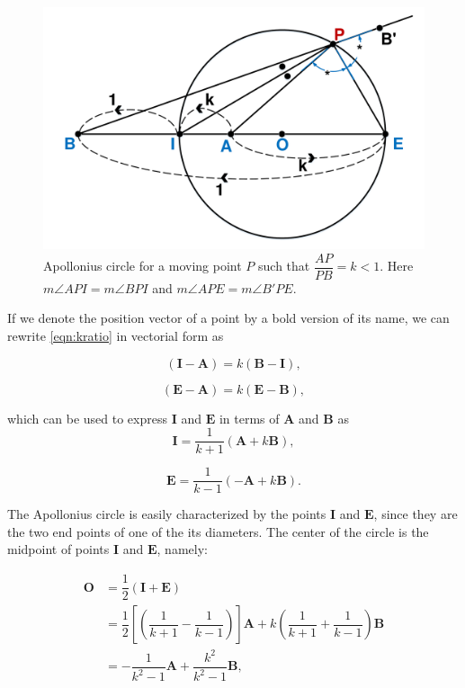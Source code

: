 \documentclass[final,5p,times,twocolumn]{elsarticle}
\begin{document}
\begin{figure}[htb]
\centering
\includegraphics[width=0.75\columnwidth]{drawing2.pdf}
\caption{Apollonius circle for a moving point $P$ such that $\dfrac{AP}{PB}=k<1$. Here $m\angle API = m\angle BPI$ and $m\angle APE = m\angle B'PE$.}
\label{2}
\end{figure}

If we denote the position vector of a point by a bold version of its name, we can rewrite \eqref{eqn:kratio} in vectorial form as

\begin{equation}
(\boldsymbol{I}-\boldsymbol{A})=k(\boldsymbol{B}-\boldsymbol{I}),
\end{equation}

\begin{equation}
(\boldsymbol {E}-\boldsymbol{A})=k(\boldsymbol{E}-\boldsymbol{B}),
\end{equation}

which can be used to express $\boldsymbol{I}$ and $\boldsymbol{E}$ in terms of $\boldsymbol{A}$ and $\boldsymbol{B}$ as 
\begin{equation}
\boldsymbol{I} = \dfrac{1}{k+1} (\boldsymbol{A}+k\boldsymbol{B}),
\label{eqn:ipoint}
\end{equation}

\begin{equation}
\boldsymbol{E} = \dfrac{1}{k-1} (-\boldsymbol{A}+k\boldsymbol{B}).
\label{eqn:epoint}
\end{equation}

The Apollonius circle is easily characterized by the points $\boldsymbol{I}$ and $\boldsymbol{E}$, since they are the two end points of one of the its diameters. The center of the circle is the midpoint of points $\boldsymbol{I}$ and $\boldsymbol{E}$, namely:

\begin{equation}
\begin{split}
\boldsymbol{O} & = \dfrac{1}{2} (\boldsymbol{I}+\boldsymbol{E})\\
& = \dfrac{1}{2} [(\dfrac{1}{k+1}-\dfrac{1}{k-1})]\boldsymbol{A}+k(\dfrac{1}{k+1}+\dfrac{1}{k-1}) \boldsymbol{B}\\
& =-\dfrac{1}{k^{2}-1}\boldsymbol{A} + \dfrac{{k^{2}}}{k^{2}-1} \boldsymbol{B},
\end{split}
\label{eqn:center}
\end{equation}
\end{document}
